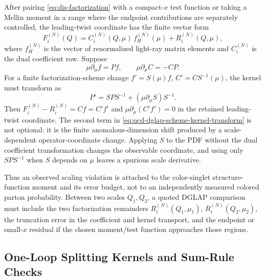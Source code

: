 \begin{controlledapproximation}
\label{ca:qcd-dglap-scheme-covariant-moment-transport}
After pairing \eqref{eq:dis-factorization} with a compact-\(x\) test function
or taking a Mellin moment in a range where the endpoint contributions are
separately controlled, the leading-twist coordinate has the finite vector
form
\begin{equation}
  F_i^{(N)}(Q)
  =
  C_i^{(N)}(Q,\mu)\,f_H^{(N)}(\mu)
  +R_i^{(N)}(Q,\mu),
  \label{eq:qcd-dglap-tested-moment-coordinate}
\end{equation}
where \(f_H^{(N)}\) is the vector of renormalized light-ray matrix elements
and \(C_i^{(N)}\) is the dual coefficient row.  Suppose
\[
  \mu\partial_\mu f=P f,
  \qquad
  \mu\partial_\mu C=-CP .
\]
For a finite factorization-scheme change
\(f'=S(\mu)f\), \(C'=CS^{-1}(\mu)\), the kernel must transform as
\begin{equation}
  P'
  =
  S P S^{-1}
  +
  (\mu\partial_\mu S)S^{-1}.
  \label{eq:qcd-dglap-scheme-kernel-transform}
\end{equation}
Then \(F_i^{(N)}-R_i^{(N)}=C f=C'f'\) and
\(\mu\partial_\mu(C'f')=0\) in the retained leading-twist coordinate.  The
second term in \eqref{eq:qcd-dglap-scheme-kernel-transform} is not optional:
it is the finite anomalous-dimension shift produced by a scale-dependent
operator-coordinate change.  Applying \(S\) to the PDF without the dual
coefficient transformation changes the observable coordinate, and using only
\(SPS^{-1}\) when \(S\) depends on \(\mu\) leaves a spurious scale derivative.

Thus an observed scaling violation is attached to the color-singlet
structure-function moment and its error budget, not to an independently
measured colored parton probability.  Between two scales \(Q_1,Q_2\), a quoted
DGLAP comparison must include the two factorization remainders
\(R_i^{(N)}(Q_1,\mu_1)\), \(R_i^{(N)}(Q_2,\mu_2)\), the truncation error in
the coefficient and kernel transport, and the endpoint or small-\(x\) residual
if the chosen moment/test function approaches those regions.
\end{controlledapproximation}

\subsection{One-Loop Splitting Kernels and Sum-Rule Checks}
\label{subsec:qcd-one-loop-splitting-kernels-sum-rules}

